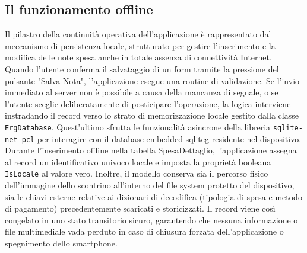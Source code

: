 \subsection*{Il funzionamento offline}
\noindent Il pilastro della continuità operativa dell'applicazione è rappresentato dal meccanismo di persistenza locale, strutturato per gestire l'inserimento e la modifica delle note spesa anche in totale assenza di connettività Internet. \\
Quando l'utente conferma il salvataggio di un form tramite la pressione del pulsante "Salva Nota", l'applicazione esegue una routine di validazione. Se l'invio immediato al server non è possibile a causa della mancanza di segnale, o se l'utente sceglie deliberatamente di posticipare l'operazione, la logica interviene instradando il record verso lo strato di memorizzazione locale gestito dalla classe \texttt{ErgDatabase}. Quest'ultimo sfrutta le funzionalità asincrone della libreria \texttt{sqlite-net-pcl} per interagire con il database embedded \gls{sqliteg} residente nel dispositivo.\\
Durante l'inserimento offline nella tabella SpesaDettaglio, l'applicazione assegna al record un identificativo univoco locale e imposta la proprietà booleana \texttt{IsLocale} al valore vero. Inoltre, il modello conserva sia il percorso fisico dell'immagine dello scontrino all'interno del file system protetto del dispositivo, sia le chiavi esterne relative ai dizionari di decodifica (tipologia di spesa e metodo di pagamento) precedentemente scaricati e storicizzati. Il record viene così congelato in uno stato transitorio sicuro, garantendo che nessuna informazione o file multimediale vada perduto in caso di chiusura forzata dell'applicazione o spegnimento dello smartphone.

